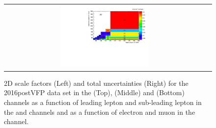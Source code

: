 \begin{figure}[htb]
\begin{center}
\begin{tabular}{cc}
      \includegraphics[width=0.45\textwidth]{fig_2016postVFP_TrigSF/h2D_lepABpt_mumu_BinErrors.pdf}\\
    \end{tabular}
    \caption{2D scale factors (Left) and total uncertainties (Right) for the 2016postVFP data set in the \emu (Top), \ee (Middle) and \mumu (Bottom) channels as a function of leading lepton \pT and sub-leading lepton \pT in the \ee and \mumu channels and as a function of electron \pT and muon \pT in the \emu channel.}
    \label{TrigSF_2016postVFP_4}
  \end{center}
\end{figure}

